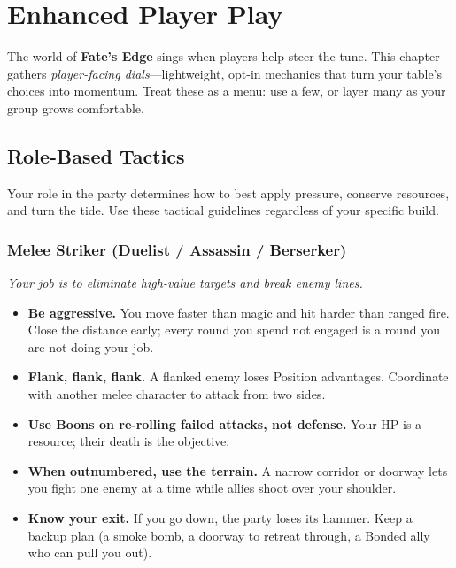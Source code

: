 \chapter{Enhanced Player Play}
\label{ch:enhanced-play}

The world of \textbf{Fate's Edge} sings when players help steer the tune. This chapter gathers \emph{player-facing dials}---lightweight, opt-in mechanics that turn your table's choices into momentum. Treat these as a menu: use a few, or layer many as your group grows comfortable.

\section{Role-Based Tactics}
\label{sec:role-tactics}

Your role in the party determines how to best apply pressure, conserve resources, and turn the tide. Use these tactical guidelines regardless of your specific build.

\subsection{Melee Striker (Duelist / Assassin / Berserker)}
\textit{Your job is to eliminate high-value targets and break enemy lines.}
\begin{itemize}
  \item \textbf{Be aggressive.} You move faster than magic and hit harder than ranged fire. Close the distance early; every round you spend not engaged is a round you are not doing your job.
  \item \textbf{Flank, flank, flank.} A flanked enemy loses Position advantages. Coordinate with another melee character to attack from two sides.
  \item \textbf{Use Boons on re-rolling failed attacks, not defense.} Your HP is a resource; their death is the objective.
  \item \textbf{When outnumbered, use the terrain.} A narrow corridor or doorway lets you fight one enemy at a time while allies shoot over your shoulder.
  \item \textbf{Know your exit.} If you go down, the party loses its hammer. Keep a backup plan (a smoke bomb, a doorway to retreat through, a Bonded ally who can pull you out).
\end{itemize}


